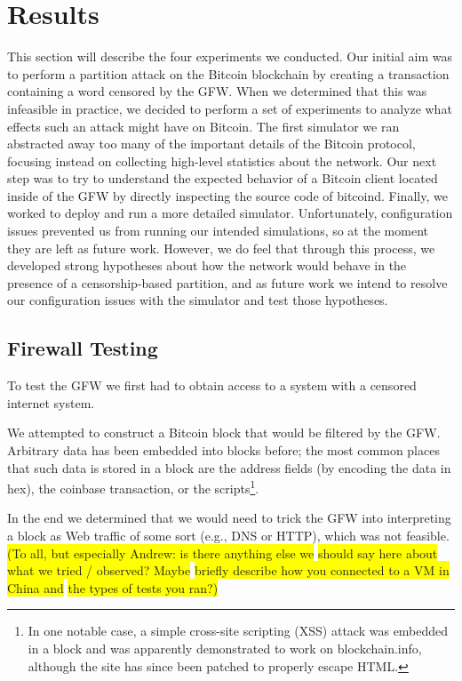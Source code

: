 \section{Results}
This section will describe the four experiments we conducted. Our initial aim was to perform a partition attack on the Bitcoin blockchain by creating a transaction containing a word censored by the GFW. When we determined that this was infeasible in practice, we decided to perform a set of experiments to analyze what effects such an attack might have on Bitcoin. The first simulator we ran abstracted away too many of the important details of the Bitcoin protocol, focusing instead on collecting high-level statistics about the network. Our next step was to try to understand the expected behavior of a Bitcoin client located inside of the GFW by directly inspecting the source code of bitcoind. Finally, we worked to deploy and run a more detailed simulator. Unfortunately, configuration issues prevented us from running our intended simulations, so at the moment they are left as future work. However, we do feel that through this process, we developed strong hypotheses about how the network would behave in the presence of a censorship-based partition, and as future work we intend to resolve our configuration issues with the simulator and test those hypotheses.

\subsection{Firewall Testing}
To test the GFW we first had to obtain access to a system with a censored internet system. 

We attempted to construct a Bitcoin block that would be filtered by the GFW. Arbitrary data has been embedded into blocks before; the most common places that such data is stored in a block are the address fields (by encoding the data in hex), the coinbase transaction, or the scripts\footnote{In one notable case, a simple cross-site scripting (XSS) attack was embedded in a block and was apparently demonstrated to work on blockchain.info\cite{reddit}, although the site has since been patched to properly escape HTML.}. 

In the end we determined that we would need to trick the GFW into interpreting a block as Web traffic of some sort (e.g., DNS or HTTP), which was not feasible.
\colorbox{yellow}{(To all, but especially Andrew: is there anything else we}
\colorbox{yellow}{should say here about what we tried / observed? Maybe}
\colorbox{yellow}{briefly describe how you connected to a VM in China and}
\colorbox{yellow}{the types of tests you ran?)}

